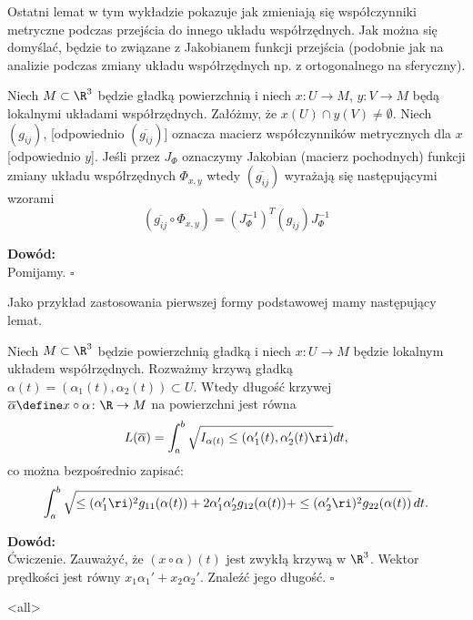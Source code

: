 Ostatni lemat w tym wykładzie pokazuje jak zmieniają się współczynniki metryczne 
podczas przejścia do innego układu współrzędnych. Jak można się domyślać, będzie 
to związane z Jakobianem funkcji przejścia (podobnie jak na analizie podczas 
zmiany układu współrzędnych np. z ortogonalnego na sferyczny).

\begin{frame}

\begin{lemat}
Niech $M\subset \R^3$ będzie gładką powierzchnią i niech $x\colon U\to M$, $y\colon V\to M$ będą lokalnymi układami współrzędnych. Załóżmy, że $x(U)\cap y(V)\neq \emptyset$. \pause Niech $(g_{ij})$, [odpowiednio $(\overline{g_{ij}})$] oznacza macierz współczynników metrycznych dla $x$ [odpowiednio $y$]. \pause Jeśli przez $J_\Phi$ oznaczymy Jakobian (macierz pochodnych) funkcji zmiany układu współrzędnych $\Phi_{x,y}$ wtedy $(\overline{g_{ij}})$ wyrażają się następującymi wzorami\pause 
\[(\overline{g_{ij}}\circ \Phi_{x,y})=(J_\Phi^{-1})^T (g_{ij})J_\Phi^{-1}\]
\end{lemat}
\pause \textcolor{ared}{\textbf{Dowód:}}\\
Pomijamy.
\hfill $\square$
\end{frame}

\begin{frame}
Jako przykład zastosowania pierwszej formy podstawowej mamy następujący lemat.
\pause \begin{lemat}
Niech $M\subset \R^3$ będzie powierzchnią gładką i niech $x\colon U\to M$ będzie lokalnym układem współrzędnych. Rozważmy krzywą gładką $\alpha(t)=(\alpha_1(t),\alpha_2(t))\subset U$.
\pause Wtedy długość krzywej $\overline{\alpha}\define x\circ\alpha\colon \R\to M$ na powierzchni jest równa
\[L(\overline{\alpha})=\int_a^b\sqrt{I_{\alpha(t)}\le(\alpha_1 '(t),\alpha_2 '(t)\ri)}dt,\]
\pause co można bezpośrednio zapisać:
\[\int_a^b\sqrt{\le(\alpha_1'\ri)^2 g_{11}(\alpha(t))+ 2 \alpha_1'\alpha_2'g_{12}(\alpha(t))+\le(\alpha_2'\ri)^2 g_{22}(\alpha(t))}\,dt.\]
\end{lemat}

\pause \textcolor{ared}{\textbf{Dowód:}}\\
Ćwiczenie. \footnotesize {Zauważyć, że $(x\circ \alpha )(t)$ jest zwykłą krzywą w $\R^3$. Wektor prędkości jest r\'owny $x_1\alpha_1' +x_2\alpha_2'$. Znaleźć jego długość.}\normalsize
\hfill $\square$


\end{frame}

\mode<all> 
